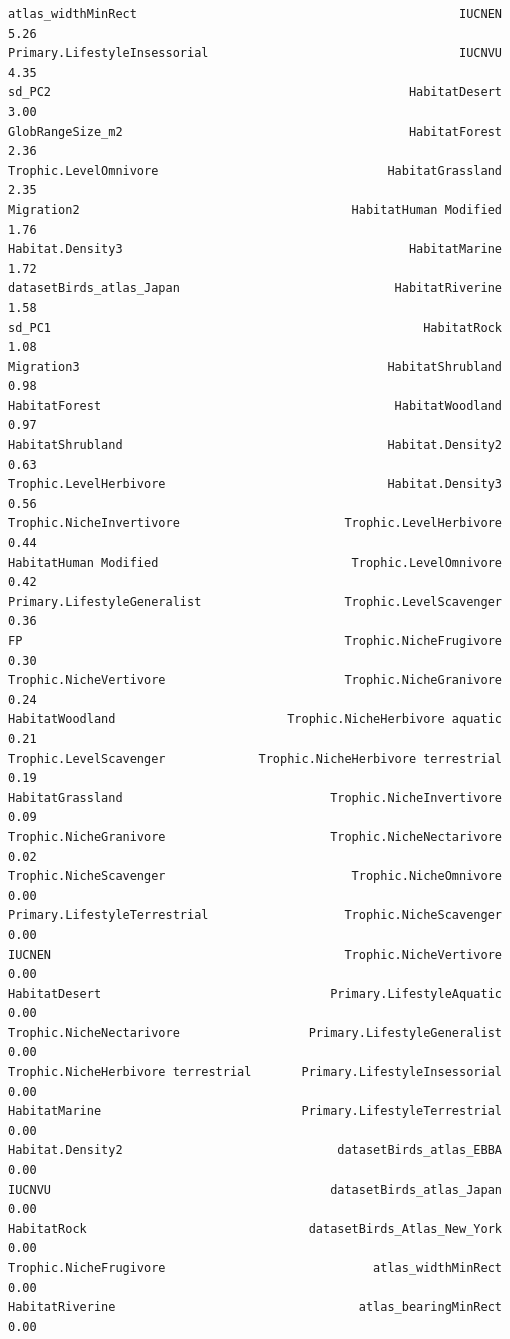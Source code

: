 \documentclass[
  letterpaper,
  DIV=11,
  numbers=noendperiod]{scrreprt}
\begin{document}
\begin{verbatim}
atlas_widthMinRect                                             IUCNEN    5.26
Primary.LifestyleInsessorial                                   IUCNVU    4.35
sd_PC2                                                  HabitatDesert    3.00
GlobRangeSize_m2                                        HabitatForest    2.36
Trophic.LevelOmnivore                                HabitatGrassland    2.35
Migration2                                      HabitatHuman Modified    1.76
Habitat.Density3                                        HabitatMarine    1.72
datasetBirds_atlas_Japan                              HabitatRiverine    1.58
sd_PC1                                                    HabitatRock    1.08
Migration3                                           HabitatShrubland    0.98
HabitatForest                                         HabitatWoodland    0.97
HabitatShrubland                                     Habitat.Density2    0.63
Trophic.LevelHerbivore                               Habitat.Density3    0.56
Trophic.NicheInvertivore                       Trophic.LevelHerbivore    0.44
HabitatHuman Modified                           Trophic.LevelOmnivore    0.42
Primary.LifestyleGeneralist                    Trophic.LevelScavenger    0.36
FP                                             Trophic.NicheFrugivore    0.30
Trophic.NicheVertivore                         Trophic.NicheGranivore    0.24
HabitatWoodland                        Trophic.NicheHerbivore aquatic    0.21
Trophic.LevelScavenger             Trophic.NicheHerbivore terrestrial    0.19
HabitatGrassland                             Trophic.NicheInvertivore    0.09
Trophic.NicheGranivore                       Trophic.NicheNectarivore    0.02
Trophic.NicheScavenger                          Trophic.NicheOmnivore    0.00
Primary.LifestyleTerrestrial                   Trophic.NicheScavenger    0.00
IUCNEN                                         Trophic.NicheVertivore    0.00
HabitatDesert                                Primary.LifestyleAquatic    0.00
Trophic.NicheNectarivore                  Primary.LifestyleGeneralist    0.00
Trophic.NicheHerbivore terrestrial       Primary.LifestyleInsessorial    0.00
HabitatMarine                            Primary.LifestyleTerrestrial    0.00
Habitat.Density2                              datasetBirds_atlas_EBBA    0.00
IUCNVU                                       datasetBirds_atlas_Japan    0.00
HabitatRock                               datasetBirds_Atlas_New_York    0.00
Trophic.NicheFrugivore                             atlas_widthMinRect    0.00
HabitatRiverine                                  atlas_bearingMinRect    0.00

\end{verbatim}
\end{document}
